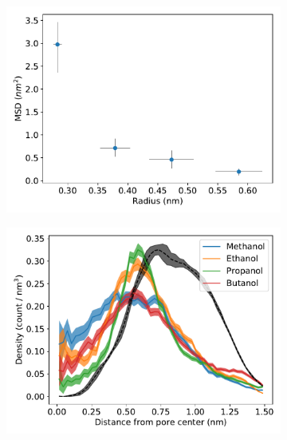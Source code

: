 \documentclass{article}
\begin{document}
  \begin{figure}
  \centering
  \begin{subfigure}{0.45\textwidth}
  \includegraphics[width=\linewidth]{msd_radius_simple_alcohols.pdf}
  \caption{}\label{fig:msd_radius_simple_alcohol_rdf}
  \end{subfigure}
  \begin{subfigure}{0.45\textwidth}
  \includegraphics[width=\linewidth]{simple_alcohol_rdf.pdf}
  \caption{}\label{fig:simple_alcohol_rdf}
  \end{subfigure}
  \begin{subfigure}{0.45\textwidth}

\end{subfigure}
\end{figure}
\end{document}
